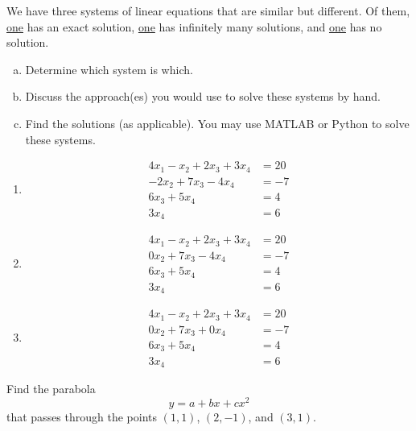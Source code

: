 \documentclass[12pt, answers]{exam}
\begin{document}
\begin{questions}
\begin{solution}
\end{solution}


\vspace*{3em}
\addpoints
\question[10] We have three systems of linear equations that are similar but different. Of them, \underline{one} has an exact solution, \underline{one} has infinitely many solutions, and \underline{one} has no solution. 
%
\begin{enumerate}[a.]
\item Determine which system is which.
\item Discuss the approach(es) you would use to solve these systems by hand.
\item Find the solutions (as applicable). You may use MATLAB or Python to solve these systems. 
\end{enumerate}
%
\begin{enumerate}
\item 
\begin{align}
4 x_1 -   x_2 + 2 x_3 + 3 x_4 &= 20 \nonumber \\
      - 2 x_2 + 7 x_3 - 4 x_4 &= -7 \nonumber \\
                6 x_3 + 5 x_4 &= 4  \nonumber \\
                        3 x_4 &= 6  \nonumber
\end{align}

\item 
\begin{align}
4 x_1 -   x_2 + 2 x_3 + 3 x_4 &= 20 \nonumber \\
        0 x_2 + 7 x_3 - 4 x_4 &= -7 \nonumber \\
                6 x_3 + 5 x_4 &= 4  \nonumber \\
                        3 x_4 &= 6  \nonumber
\end{align}

\item 
\begin{align}
4 x_1 -   x_2 + 2 x_3 + 3 x_4 &= 20 \nonumber \\
        0 x_2 + 7 x_3 + 0 x_4 &= -7 \nonumber \\
                6 x_3 + 5 x_4 &= 4  \nonumber \\
                        3 x_4 &= 6  \nonumber
\end{align}
\end{enumerate}


\vspace*{3em}
\addpoints
\question[10] Find the parabola
\[ y = a + bx + cx^2\]
that passes through the points $(1,1)$, $(2,-1)$, and $(3,1)$. 


\end{questions}
\end{document}
